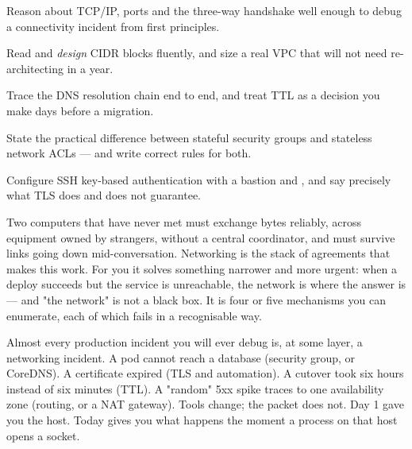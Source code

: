 
\begin{objectives}
\begin{wbitem}
  \item Reason about TCP/IP, ports and the three-way handshake well enough to debug a connectivity incident from first principles.
  \item Read and \emph{design} CIDR blocks fluently, and size a real VPC that will not need re-architecting in a year.
  \item Trace the DNS resolution chain end to end, and treat TTL as a decision you make days before a migration.
  \item State the practical difference between stateful security groups and stateless network ACLs --- and write correct rules for both.
  \item Configure SSH key-based authentication with a bastion and , and say precisely what TLS does and does not guarantee.
\end{wbitem}
\end{objectives}


 Two computers that have never met must exchange bytes reliably, across equipment owned by strangers, without a central coordinator, and must survive links going down mid-conversation. Networking is the stack of agreements that makes this work. For you it solves something narrower and more urgent: when a deploy succeeds but the service is unreachable, the network is where the answer is --- and "the network" is not a black box. It is four or five mechanisms you can enumerate, each of which fails in a recognisable way.

 Almost every production incident you will ever debug is, at some layer, a networking incident. A pod cannot reach a database (security group, or CoreDNS). A certificate expired (TLS and automation). A cutover took six hours instead of six minutes (TTL). A "random" 5xx spike traces to one availability zone (routing, or a NAT gateway). Tools change; the packet does not. Day 1 gave you the host. Today gives you what happens the moment a process on that host opens a socket.

